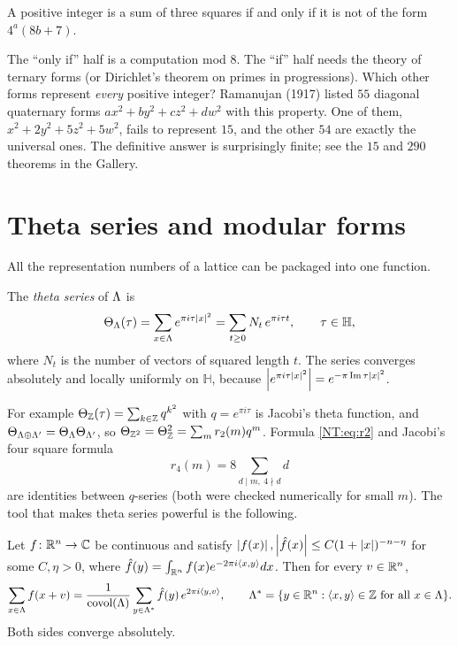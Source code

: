 \begin{theorem}\label{NT:thm:legendre}
A positive integer is a sum of three squares if and only if it is not of the form $4^a(8b+7)$.
\end{theorem}

The ``only if'' half is a computation mod $8$. The ``if'' half needs the theory of ternary forms (or
Dirichlet's theorem on primes in progressions). Which other forms represent \emph{every} positive integer?
Ramanujan (1917) listed $55$ diagonal quaternary forms $ax^2+by^2+cz^2+dw^2$ with this property. One of
them, $x^2+2y^2+5z^2+5w^2$, fails to represent $15$, and the other $54$ are exactly the universal ones. The definitive answer is surprisingly finite; see the $15$ and $290$ theorems in
the Gallery.

\section{Theta series and modular forms}
\label{NT:sec:theta}

All the representation numbers of a lattice can be packaged into one function.

\begin{definition}\label{NT:def:theta}
The \emph{theta series} of $\Lambda$ is
\[
  \Theta_\Lambda(\tau)=\sum_{x\in\Lambda}e^{\pi i\tau\left\lvert x \right\rvert^2}=\sum_{t\ge0}N_t\,e^{\pi i\tau t},
  \qquad \tau\in\mathbb H,
\]
where $N_t$ is the number of vectors of squared length $t$. The series converges absolutely and locally
uniformly on $\mathbb H$, because $\left\lvert e^{\pi i\tau\left\lvert x \right\rvert^2} \right\rvert=e^{-\pi\operatorname{Im}\tau\left\lvert x \right\rvert^2}$.
\end{definition}

For example $\Theta_{\mathbb{Z}}(\tau)=\sum_{k\in\mathbb{Z}}q^{k^2}$ with $q=e^{\pi i\tau}$ is Jacobi's theta function,
and $\Theta_{\Lambda\oplus\Lambda'}=\Theta_\Lambda\Theta_{\Lambda'}$, so
$\Theta_{\mathbb{Z}^2}=\Theta_{\mathbb{Z}}^2=\sum_mr_2(m)q^m$. Formula \eqref{NT:eq:r2} and Jacobi's four square formula
\begin{equation}\label{NT:eq:r4}
  r_4(m)=8\sum_{d\mid m,\ 4\nmid d}d
\end{equation}
are identities between $q$-series (both were checked numerically for small $m$). The tool that makes
theta series powerful is the following.

\begin{theorem}\label{NT:thm:poisson}
Let $f\colon\mathbb{R}^n\to\mathbb{C}$ be continuous and satisfy $\left\lvert f(x) \right\rvert,\left\lvert \hat f(x) \right\rvert\le C(1+\left\lvert x \right\rvert)^{-n-\eta}$ for some $C,\eta>0$,
where $\hat f(y)=\int_{\mathbb{R}^n}f(x)e^{-2\pi i\langle x, y\rangle}dx$. Then for every $v\in\mathbb{R}^n$,
\[
  \sum_{x\in\Lambda}f(x+v)=\frac{1}{\operatorname{covol}(\Lambda)}\sum_{y\in\Lambda^*}\hat f(y)\,e^{2\pi i\langle y, v\rangle},
  \qquad \Lambda^*=\{y\in\mathbb{R}^n:\langle x, y\rangle\in\mathbb{Z}\ \text{for all }x\in\Lambda\}.
\]
Both sides converge absolutely.
\end{theorem}

